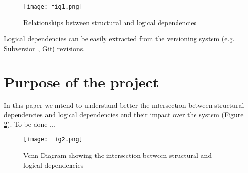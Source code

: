 \begin{figure}[h]
\centering
\texttt{[image: fig1.png]}
\caption{Relationships between structural and logical dependencies }
\label{fig:fig1}
\centering
\end{figure}

Logical dependencies can be easily extracted from the versioning system (e.g. Subversion , Git) revisions. 


\section{Purpose of the project}
In this paper we intend to understand better the intersection between structural dependencies and logical dependencies and their impact over the system (Figure \ref{fig:fig2}). 
To be done ...


\begin{figure}[h]
\centering
\texttt{[image: fig2.png]}
\caption{Venn Diagram showing the intersection between structural and logical dependencies }
\label{fig:fig2}
\end{figure}